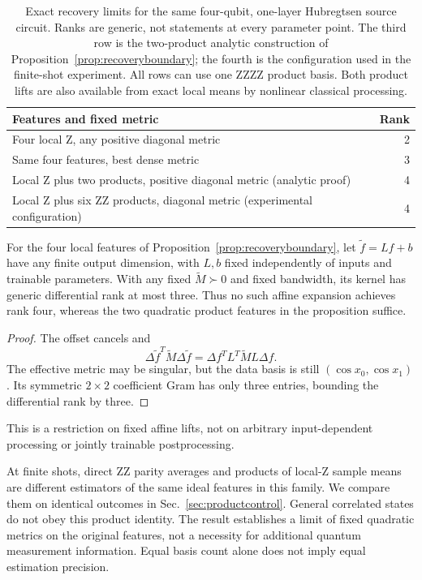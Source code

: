 \begin{table}[t]
\caption{Exact recovery limits for the same four-qubit, one-layer
Hubregtsen source circuit. Ranks are generic, not statements at every
parameter point. The third row is the two-product analytic construction
of Proposition~\ref{prop:recoveryboundary}; the fourth is the
configuration used in the finite-shot experiment. All rows can use
one ZZZZ product basis. Both product lifts are also available from
exact local means by nonlinear classical processing.}
\label{tab:recoverymechanism}
\begin{tabular}{@{}>{\raggedright\arraybackslash}p{}r@{}}
\toprule
Features and fixed metric & Rank\\
\midrule
Four local Z, any positive diagonal metric & 2\\
Same four features, best dense metric & 3\\
Local Z plus two products, positive diagonal metric (analytic proof) & 4\\
Local Z plus six ZZ products, diagonal metric (experimental configuration) & 4\\
\bottomrule
\end{tabular}
\end{table}
\begin{corollary}
\label{cor:affineceiling}
For the four local features of Proposition~\ref{prop:recoveryboundary},
let $\widetilde f=Lf+b$ have any finite output dimension, with $L,b$
fixed independently of inputs and trainable parameters. With any
fixed $\widetilde M\succ0$ and fixed bandwidth, its kernel has
generic differential rank at most three. Thus no such affine
expansion achieves rank four, whereas the two quadratic product
features in the proposition suffice.
\end{corollary}
\begin{proof}
The offset cancels and
\begin{equation}
 \Delta\widetilde f^T\widetilde M\Delta\widetilde f
 =\Delta f^T L^T\widetilde M L\Delta f.
\end{equation}
The effective metric may be singular, but the data basis is still
$(\cos x_0,\cos x_1)$. Its symmetric $2\times2$ coefficient Gram
has only three entries, bounding the differential rank by three.
\end{proof}
This is a restriction on fixed affine lifts, not on arbitrary
input-dependent processing or jointly trainable postprocessing.

At finite shots, direct ZZ parity averages and products of local-Z
sample means are different estimators of the same ideal features in
this family. We compare them on identical outcomes in
Sec.~\ref{sec:productcontrol}. General correlated states do not obey
this product identity. The result establishes a limit of fixed
quadratic metrics on the original features, not a necessity for
additional quantum measurement information. Equal basis count alone
does not imply equal estimation precision.

